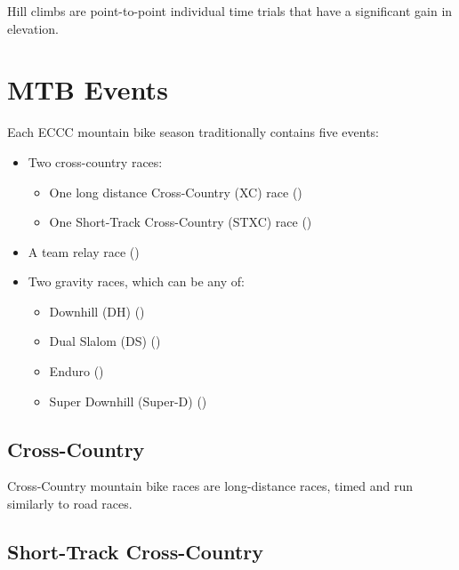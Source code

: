 \documentclass[
  letterpaper, %
  fontsize=10pt, %
  twoside=true,
  chapterentrydots=true, %
  numbers=noenddot,
  fontmethod=tex,
]{kaobook}
\begin{document}
Hill climbs are point-to-point individual time trials that have a significant gain in elevation.

\section{MTB Events}

Each ECCC mountain bike season traditionally contains five events:

\begin{itemize}
  \item Two cross-country races:
  \begin{itemize}
      \item One long distance Cross-Country (XC) race ()
      \item One Short-Track Cross-Country (STXC) race ()
  \end{itemize}
  \item A team relay race ()
  \item Two gravity races, which can be any of:
  \begin{itemize}
      \item Downhill (DH) ()
      \item Dual Slalom (DS) ()
      \item Enduro ()
      \item Super Downhill (Super-D) ()
  \end{itemize}
\end{itemize}

\subsection{Cross-Country}

Cross-Country mountain bike races are long-distance races,
timed and run similarly to road races. %

\subsection{Short-Track Cross-Country}
\end{document}

